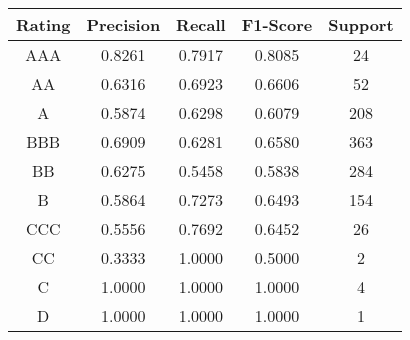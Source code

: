\footnotesize
\begin{tabular}{ccccc}
\toprule
Rating & Precision & Recall & F1-Score & Support \\
\midrule
AAA & 0.8261 & 0.7917 & 0.8085 & 24 \\
AA & 0.6316 & 0.6923 & 0.6606 & 52 \\
A & 0.5874 & 0.6298 & 0.6079 & 208 \\
BBB & 0.6909 & 0.6281 & 0.6580 & 363 \\
BB & 0.6275 & 0.5458 & 0.5838 & 284 \\
B & 0.5864 & 0.7273 & 0.6493 & 154 \\
CCC & 0.5556 & 0.7692 & 0.6452 & 26 \\
CC & 0.3333 & 1.0000 & 0.5000 & 2 \\
C & 1.0000 & 1.0000 & 1.0000 & 4 \\
D & 1.0000 & 1.0000 & 1.0000 & 1 \\
\bottomrule
\end{tabular}

\normalsize